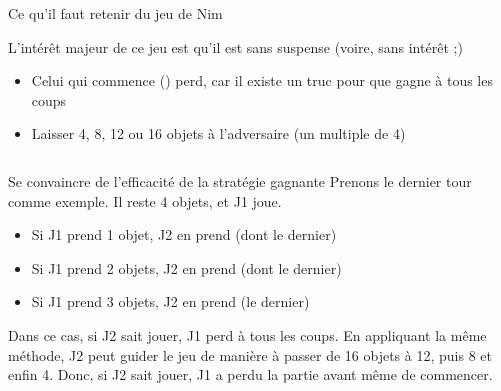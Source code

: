 \begin{frame}{Ce qu'il faut retenir du jeu de Nim}

  \begin{block}{L'intérêt majeur de ce jeu est qu'il est sans suspense 
      {\color{black}\normalsize(voire, sans intérêt ;)}}
    \begin{itemize}
    \item Celui qui commence () perd, car il existe un truc pour
      que  gagne à tous les coups
    \item {} Laisser 4, 8, 12 ou 16 objets à
      l'adversaire (un multiple de 4)
    \end{itemize}
  \end{block}

  \begin{columns}
    \begin{column}{0.7\linewidth}

      \begin{block}{Se convaincre de l'efficacité de la stratégie gagnante}
        Prenons le dernier tour comme exemple. Il reste 4 objets, et J1 joue.

        \begin{itemize}
        \item Si J1 prend \alert{1} objet, J2 en prend  (dont le dernier) 
        \item Si J1 prend \alert{2} objets, J2 en prend  (dont le dernier)
        \item Si J1 prend \alert{3} objets, J2 en prend  (le dernier) 
        \end{itemize}        

        Dans ce cas, si J2 sait jouer, J1 perd à tous les coups.  En appliquant la même méthode, J2 peut guider le jeu de manière à passer de 16 objets à 12, puis 8 et enfin 4. Donc, si J2 sait jouer, J1 a perdu la partie avant même de commencer.
        
      \end{block}


\end{column}
\end{columns}
\end{frame}
